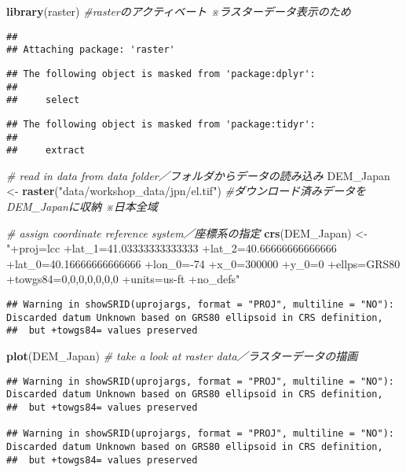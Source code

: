 \documentclass[
  xelatex,ja=standard]{bxjsarticle}
\newenvironment{Shaded}{\begin{snugshade}}{\end{snugshade}}
\newcommand{\CommentTok}[1]{\textcolor[rgb]{0.56,0.35,0.01}{\textit{#1}}}
\newcommand{\KeywordTok}[1]{\textcolor[rgb]{0.13,0.29,0.53}{\textbf{#1}}}
\newcommand{\NormalTok}[1]{#1}
\newcommand{\StringTok}[1]{\textcolor[rgb]{0.31,0.60,0.02}{#1}}
\begin{document}
\begin{Shaded}
\begin{Highlighting}[]
\KeywordTok{library}\NormalTok{(raster) }\CommentTok{#rasterのアクティベート ※ラスターデータ表示のため  }
\end{Highlighting}
\end{Shaded}

\begin{verbatim}
## 
## Attaching package: 'raster'
\end{verbatim}

\begin{verbatim}
## The following object is masked from 'package:dplyr':
## 
##     select
\end{verbatim}

\begin{verbatim}
## The following object is masked from 'package:tidyr':
## 
##     extract
\end{verbatim}

\begin{Shaded}
\begin{Highlighting}[]
\CommentTok{# read in data from data folder／フォルダからデータの読み込み}
\NormalTok{DEM_Japan <-}\StringTok{ }\KeywordTok{raster}\NormalTok{(}\StringTok{"data/workshop_data/jpn/el.tif"}\NormalTok{)  }\CommentTok{#ダウンロード済みデータをDEM_Japanに収納 ※日本全域  }

\CommentTok{# assign coordinate reference system／座標系の指定}
\KeywordTok{crs}\NormalTok{(DEM_Japan) <-}\StringTok{ "+proj=lcc +lat_1=41.03333333333333 +lat_2=40.66666666666666 +lat_0=40.16666666666666 +lon_0=-74 +x_0=300000 +y_0=0 +ellps=GRS80 +towgs84=0,0,0,0,0,0,0 +units=us-ft +no_defs"}
\end{Highlighting}
\end{Shaded}

\begin{verbatim}
## Warning in showSRID(uprojargs, format = "PROJ", multiline = "NO"): Discarded datum Unknown based on GRS80 ellipsoid in CRS definition,
##  but +towgs84= values preserved
\end{verbatim}

\begin{Shaded}
\begin{Highlighting}[]
\KeywordTok{plot}\NormalTok{(DEM_Japan) }\CommentTok{# take a look at raster data／ラスターデータの描画  }
\end{Highlighting}
\end{Shaded}

\begin{verbatim}
## Warning in showSRID(uprojargs, format = "PROJ", multiline = "NO"): Discarded datum Unknown based on GRS80 ellipsoid in CRS definition,
##  but +towgs84= values preserved

## Warning in showSRID(uprojargs, format = "PROJ", multiline = "NO"): Discarded datum Unknown based on GRS80 ellipsoid in CRS definition,
##  but +towgs84= values preserved
\end{verbatim}
\end{document}
